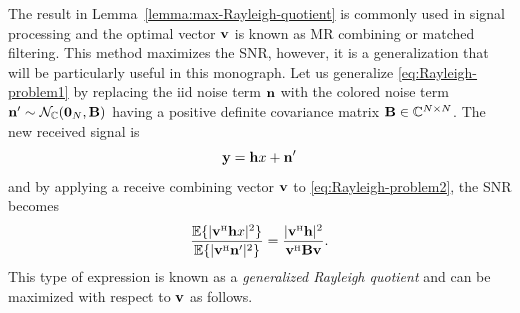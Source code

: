 \enlargethispage{0.5\baselineskip} 

The result in Lemma~\ref{lemma:max-Rayleigh-quotient} is commonly used in signal processing and the optimal vector $\mathbf{v}$ is known as \gls{MR} combining or matched filtering. This method maximizes the SNR, however, it is a generalization that will be particularly useful in this monograph. Let us generalize \eqref{eq:Rayleigh-problem1} by replacing the \gls{iid} noise term $\mathbf{n}$ with the colored noise term $\mathbf{n}' \sim \mathcal{N}_{\mathbb{C}}(\mathbf{0}_N,\mathbf{B})$ having a positive definite covariance matrix $\mathbf{B} \in \mathbb{C}^{N \times N}$. The new received signal is
\begin{equation} \label{eq:Rayleigh-problem2}
\mathbf{y} = \mathbf{h} x + \mathbf{n}'
\end{equation}
and by applying a receive combining vector $\mathbf{v}$ to \eqref{eq:Rayleigh-problem2}, the SNR becomes
\begin{equation}
\frac{ \mathbb{E}\{ | \vect{v}^{\Htran} \vect{h} x  |^2 \} }{ \mathbb{E}\{ | \vect{v}^{\Htran}  \vect{n}'  |^2 \} } = \frac{ | \vect{v}^{\Htran} \vect{h}  |^2  }{\vect{v}^{\Htran} \vect{B} \vect{v} }.
\end{equation}
This type of expression is known as a \emph{generalized Rayleigh quotient} and can be maximized with respect to $\mathbf{v}$ as follows.


